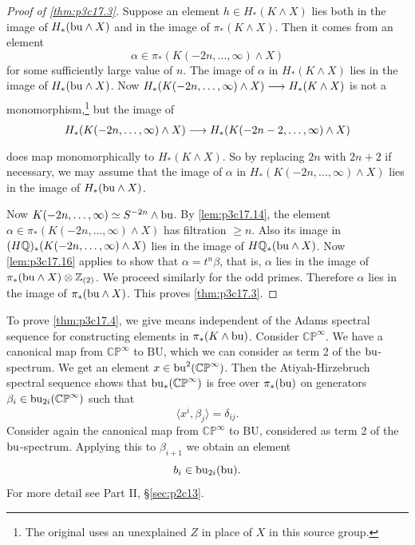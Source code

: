 \documentclass[../main]{subfiles}
\begin{document}
\begin{proof}[Proof of \ref{thm:p3c17.3}]
Suppose an element $h\in H_\ast(K\wedge X)$ lies both in the image of $H_\ast(\mathrm{bu}\wedge X)$ and in the image of $\pi_\ast(K\wedge X)$. Then it comes from an element \[\alpha\in\pi_\ast(K(-2n,\ldots,\infty)\wedge X)\] for some sufficiently large value of $n$. The image of $\alpha$ in $H_\ast(K\wedge X)$ lies in the image of $H_\ast(\mathrm{bu}\wedge X)$. Now $H_\ast(K(-2n,\ldots,\infty)\wedge X)\lar{}H_\ast(K\wedge X)$ is not a monomorphism,\footnote{The original uses an unexplained $Z$ in place of $X$ in this source group.} but the image of \[H_\ast(K(-2n,\ldots,\infty)\wedge X)\lar{}H_\ast(K(-2n-2,\ldots,\infty)\wedge X)\] does map monomorphically to $H_\ast(K\wedge X)$. So by replacing $2n$ with $2n+2$ if necessary, we may assume that the image of $\alpha$ in $H_\ast(K(-2n,\ldots,\infty)\wedge X)$ lies in the image of $H_\ast(\mathrm{bu}\wedge X)$.

Now $K(-2n, \ldots, \infty) \simeq S^{-2n} \wedge \mathrm{bu}$. By \ref{lem:p3c17.14}, the element \newline $\alpha \in \pi_\ast(K(-2n, \ldots, \infty) \wedge X)$ has filtration $\ge n$. Also its image in \newline $(H\mathbb{Q})_\ast(K(-2n, \ldots, \infty) \wedge X)$ lies in the image of $H\mathbb{Q}_\ast(\mathrm{bu} \wedge X)$. Now \ref{lem:p3c17.16} applies to show that $\alpha = t^n \beta$, that is, $\alpha$ lies in the image of $\pi_\ast(\mathrm{bu} \wedge X) \otimes \mathbb{Z}_{(2)}$. We proceed similarly for the odd primes. Therefore $\alpha$ lies in the image of $\pi_\ast(\mathrm{bu} \wedge X)$. This proves \ref{thm:p3c17.3}. 
\end{proof}

To prove \ref{thm:p3c17.4}, we give means independent of the Adams spectral sequence for constructing elements in $\pi_\ast(K\wedge\mathrm{bu})$. Consider $\mathbb{CP}^\infty$. We have a canonical map from $\mathbb{CP}^\infty$ to $\mathrm{BU}$, which we can consider as term 2 of the $\mathrm{bu}$-spectrum. We get an element $x\in\mathrm{bu}^2(\mathbb{CP}^\infty)$. Then the Atiyah-Hirzebruch spectral sequence shows that $\mathrm{bu}_\ast(\mathbb{CP}^\infty)$ is free over $\pi_\ast(\mathrm{bu})$ on generators $\beta_i\in\mathrm{bu}_{2i}(\mathbb{CP}^\infty)$ such that \[\langle x^i,\beta_j\rangle=\delta_{ij}.\] Consider again the canonical map from $\mathbb{CP}^\infty$ to $\mathrm{BU}$, considered as term 2 of the $\mathrm{bu}$-spectrum. Applying this to $\beta_{i+1}$ we obtain an element \[b_i\in\mathrm{bu}_{2i}(\mathrm{bu}).\] For more detail see Part II, \S\ref{sec:p2c13}.
\end{document}

